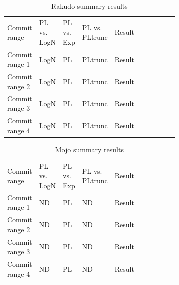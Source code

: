\documentclass[conference]{IEEEtran}
\begin{document}
\begin{table}[h!tbp]
	\caption{Rakudo summary results}
	\begin{center}
		\begin{tabular}{| p{0.12\linewidth} | p{0.08\linewidth} | p{0.08\linewidth} | p{0.08\linewidth} | p{0.1\linewidth} |p{0.13\linewidth} | p{0.09\linewidth} |}
			\hline
                  Commit range & PL vs. LogN & PL vs. Exp & PL vs. PLtrunc & Result \\
                  Commit range 1 &   LogN & PL  &PLtrunc & Result \\
                  Commit range 2&  LogN & PL  &PLtrunc & Result \\
                  Commit range 3&  LogN & PL  &PLtrunc & Result \\
                  Commit range 4&  LogN & PL  &PLtrunc & Result \\
			\hline

			\hline
		\end{tabular}
	\end{center}
\label{tab:2019testsrakudo}
\end{table}


\begin{table}[h!tbp]
	\caption{Mojo summary results}
	\begin{center}
		\begin{tabular}{| p{0.12\linewidth} | p{0.08\linewidth} | p{0.08\linewidth} | p{0.08\linewidth} | p{0.1\linewidth} |p{0.13\linewidth} | p{0.09\linewidth} |}
			\hline
                  Commit range & PL vs. LogN & PL vs. Exp & PL vs. PLtrunc & Result \\
                  Commit range 1 &  ND & PL  & ND & Result \\
                  Commit range 2& ND & PL  & ND & Result \\
                  Commit range 3& ND  &  PL & ND & Result \\
                  Commit range 4& ND & PL  & ND & Result \\
			\hline

			\hline
		\end{tabular}
	\end{center}
\label{tab:2019testsmojo}
\end{table}
\end{document}
